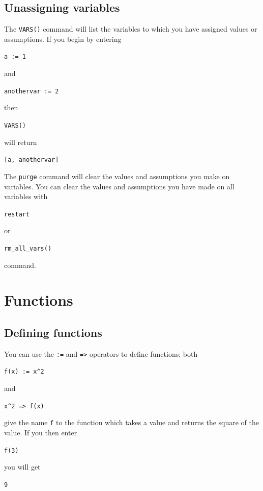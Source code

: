 \documentclass[a4paper,11pt]{book}
\begin{document}
\subsection{Unassigning variables}

The \texttt{VARS()} command will list the variables to which you have
assigned values or assumptions.  If you begin by entering
\begin{center}
  {\tt a := 1}
\end{center}
and
\begin{center}
  {\tt anothervar := 2}
\end{center}
then 
\begin{center}
  {\tt VARS()}
\end{center}
will return
\begin{center}
  {\tt [a, anothervar]}
\end{center}

The \texttt{purge} command will clear the values and
assumptions you make on variables.  You can clear the values and
assumptions you have made on all variables with
\begin{center}
  {\tt restart}
\end{center}
or
\begin{center}
  {\tt rm\_all\_vars()}
\end{center}
command.

\section{Functions}

\subsection{Defining functions}

You can use the \texttt{:=}\index{:=} and \texttt{=>}\index{=>}
operators to define functions; both
\begin{center}
  {\tt f(x) := x\^{}2}
\end{center}
and
\begin{center}
  {\tt x\^{}2 => f(x)}
\end{center}
give the name \texttt{f} to the function which takes a value and 
returns the square of the value.  If you then enter
\begin{center}
  {\tt f(3)}
\end{center}
you will get
\begin{center}
  {\tt 9}
\end{center}
\end{document}
